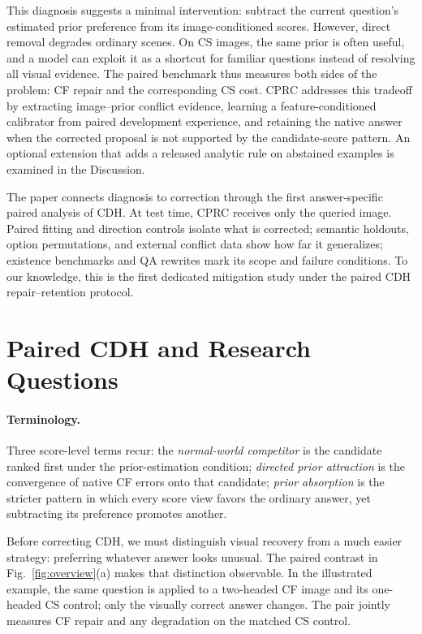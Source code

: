 \documentclass[letterpaper]{article}
\begin{document}
This diagnosis suggests a minimal intervention: subtract the current
question's estimated prior preference from its image-conditioned scores.
However, direct removal degrades ordinary scenes. On CS images, the same prior
is often useful, and a model can exploit it as a shortcut for familiar
questions instead of resolving all visual evidence. The paired benchmark thus
measures both sides of the problem: CF repair and the corresponding CS cost. CPRC addresses this tradeoff by extracting
image--prior conflict evidence, learning a feature-conditioned calibrator from
paired development experience, and retaining the native answer when the
corrected proposal is not supported by the candidate-score pattern. An
optional extension that adds a released analytic rule on abstained examples is
examined in the Discussion.

The paper connects diagnosis to correction through the first answer-specific
paired analysis of CDH. At test time, CPRC receives only the queried image. Paired
fitting and direction controls isolate what is corrected; semantic holdouts,
option permutations, and external conflict data show how far it generalizes;
existence benchmarks and QA rewrites mark its scope and failure conditions. To our knowledge, this is the first dedicated
mitigation study under the paired CDH repair--retention protocol.

\section{Paired CDH and Research Questions}

\paragraph{Terminology.} Three score-level terms recur: the \emph{normal-world
competitor} is the candidate ranked first under the prior-estimation condition;
\emph{directed prior attraction} is the convergence of native CF errors onto
that candidate; \emph{prior absorption} is the stricter pattern in which every
score view favors the ordinary answer, yet subtracting its preference promotes
another.

Before correcting CDH, we must distinguish visual recovery from a much easier
strategy: preferring whatever answer looks unusual. The paired contrast in
Fig.~\ref{fig:overview}(a) makes that distinction observable. In the illustrated
example, the same question is applied to a two-headed CF image and its
one-headed CS control; only the visually correct answer changes. The pair
jointly measures CF repair and any degradation on the matched CS control.
\end{document}
